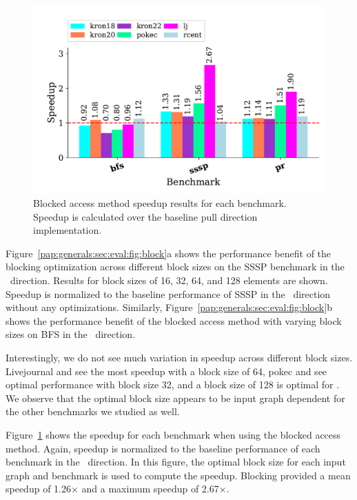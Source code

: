 \begin{figure}[h!]
    \centering
    \includegraphics[scale = 0.6]{graphit-figures/all-blocked.pdf}
    \caption{Blocked access method speedup results for each benchmark. Speedup is calculated over the baseline pull direction implementation.} %
    \label{pap:generals:sec:eval:fig:blocked}
\end{figure}
 
Figure~\ref{pap:generals:sec:eval:fig:block}a shows the performance benefit of the blocking optimization across different block sizes on the SSSP benchmark in the \pull~direction. 
Results for block sizes of 16, 32, 64, and 128 elements are shown.
Speedup is normalized to the baseline performance of SSSP in the \pull~direction without any optimizations.
Similarly, Figure~\ref{pap:generals:sec:eval:fig:block}b shows the performance benefit of the blocked access method with varying block sizes on BFS in the \pull~direction.
 
Interestingly, we do not see much variation in speedup across different block sizes. 
Livejournal and  see the most speedup with a block size of 64, pokec and  see optimal performance with block size 32, and a block size of 128 is optimal for . 
We observe that the optimal block size appears to be input graph dependent for the other benchmarks we studied as well. 
 
Figure~\ref{pap:generals:sec:eval:fig:blocked} shows the speedup for each benchmark when using the blocked access method. 
Again, speedup is normalized to the baseline performance of each benchmark in the \pull~direction.
In this figure, the optimal block size for each input graph and benchmark is used to compute the speedup. 
Blocking provided a mean speedup of 1.26$\times$ and a maximum speedup of 2.67$\times$.
 
